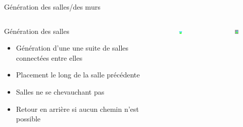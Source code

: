 \documentclass{beamer}
\begin{document}
{\begin{frame}{Génération des salles/des murs}
    \begin{columns}
        \begin{block}{Génération des salles}
            \begin{itemize}
                \item[\bullet] Génération d'une une suite de salles connectées entre elles
                \item[\bullet] Placement le long de la salle précédente
                \item[\bullet] Salles ne se chevauchant pas
                \item[\bullet] Retour en arrière si aucun chemin n'est possible
            \end{itemize}
        \end{block}
        \begin{figure}
            \centering
            \includegraphics[width=0.9\textwidth]{room_placement}
        \end{figure}
        \begin{figure}
            \centering
            \includegraphics[width=0.9\textwidth]{filling_the_world}
        \end{figure}
    \end{columns}
\end{frame}

}
\end{document}
